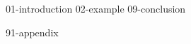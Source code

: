 \documentclass[a4paper,oneside,10pt,ngerman,english]{scrbook}
\begin{document}


\mainmatter


{01-introduction}
{02-example}
{09-conclusion}


\cleardoubleoddpage
\printbibliography

\appendix


{91-appendix}


\cleardoubleoddpage
\end{document}
